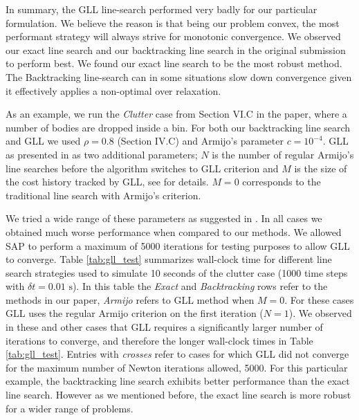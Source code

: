 In summary, the GLL line-search performed very badly for our particular
formulation. We believe the reason is that being our problem convex, the most
performant strategy will always strive for monotonic convergence. We observed
our exact line search and our backtracking line search in the original
submission to perform best. We found our exact line search to be the most robust
method. The Backtracking line-search can in some situations slow down
convergence given it effectively applies a non-optimal over relaxation.

As an example, we run the \emph{Clutter} case from Section VI.C in the paper,
where a number of bodies are dropped inside a bin. For both our backtracking
line search and GLL we used $\rho=0.8$ (Section IV.C) and Armijo's parameter
$c=10^{-4}$. GLL as presented in \cite{bib:grippo1986nonmonotone} as two
additional parameters; $N$ is the number of regular Armijo's line searches
before the algorithm switches to GLL criterion and $M$ is the size of the cost
history tracked by GLL, see \cite{bib:grippo1986nonmonotone} for details. $M=0$
corresponds to the traditional line search with Armijo's criterion. 

We tried a wide range of these parameters as suggested in
\cite{bib:grippo1986nonmonotone}. In all cases we obtained much worse
performance when compared to our methods. We allowed SAP to perform a maximum of
5000 iterations for testing purposes to allow GLL to converge. Table
\ref{tab:gll_test} summarizes wall-clock time for different line search
strategies used to simulate 10 seconds of the clutter case (1000 time steps with
$\delta t = 0.01\text{~s}$). In this table the \emph{Exact} and
\emph{Backtracking} rows refer to the methods in our paper, \emph{Armijo} refers
to GLL method when $M=0$. For these cases GLL uses the regular Armijo criterion
on the first iteration ($N=1$). We observed in these and other cases that GLL
requires a significantly larger number of iterations to converge, and therefore
the longer wall-clock times in Table \ref{tab:gll_test}. Entries with
\emph{crosses} refer to cases for which GLL did not converge for the maximum
number of Newton iterations allowed, 5000. For this particular example, the
backtracking line search exhibits better performance than the exact line search.
However as we mentioned before, the exact line search is more robust for a wider
range of problems.

